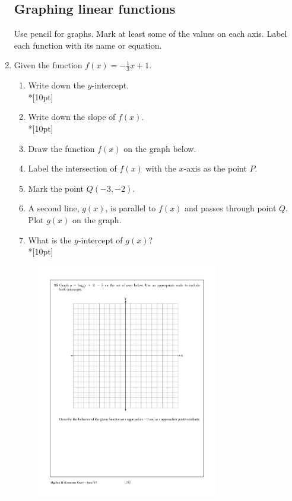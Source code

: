 \documentclass[]{book}
\begin{document}
\begin{enumerate}
\newpage
\subsection*{Graphing linear functions}
Use pencil for graphs. Mark at least some of the values on each axis. Label each function with its name or equation. 
\item Given the function $f(x)=-\frac{1}{3}x+1$. 
\begin{enumerate}
    \item Write down the $y$-intercept.\\*[10pt]
    \item Write down the slope of $f(x)$.\\*[10pt]
    \item Draw the function $f(x)$ on the graph below.
    \item Label the intersection of $f(x)$ with the $x$-axis as the point $P$.
    \item Mark the point $Q (-3, -2)$.
    \item A second line, $g(x)$, is parallel to $f(x)$ and passes through point $Q$. Plot $g(x)$ on the graph.
    \item What is the $y$-intercept of $g(x)$?\\*[10pt]
\end{enumerate}

\begin{figure}[!ht]
    \centering
    \includegraphics[width=0.75\textwidth]{regents-grid.pdf}
\end{figure}


\end{enumerate}
\end{document}
